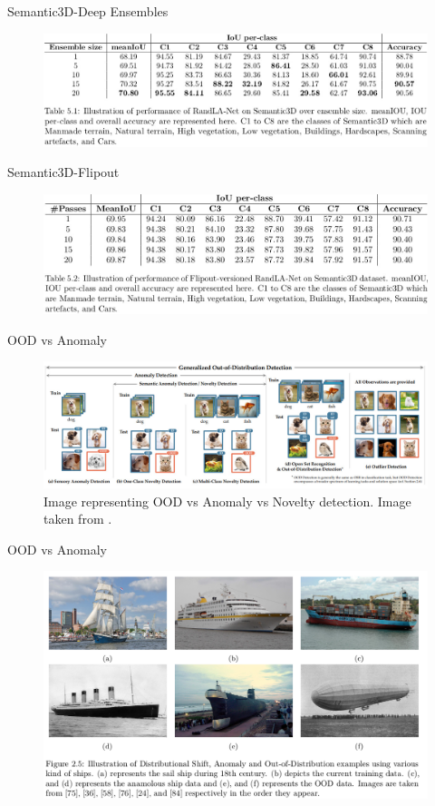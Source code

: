 \documentclass[aspectratio=169]{beamer}
\begin{document}
\begin{frame}[noframenumbering]{Semantic3D-Deep Ensembles}
    \begin{figure}
        \centering
        \includegraphics[scale=0.4]{images/Semantic3d_DE.jpg}
    \end{figure}
\end{frame}
\begin{frame}[noframenumbering]{Semantic3D-Flipout}
    \begin{figure}
        \centering
        \includegraphics[scale=0.4]{images/Semantic3d_Fout.jpg}
    \end{figure}
\end{frame}
\begin{frame}[noframenumbering]{OOD vs Anomaly}
    \begin{figure}
        \centering
        \includegraphics[scale=0.3]{images/OOD_ex_new.jpg}
        \caption{Image representing OOD vs Anomaly vs Novelty detection. Image taken from \cite{yang2021generalized}.}
        \label{fig:my_label}
    \end{figure}
\end{frame}
\begin{frame}{OOD vs Anomaly}
    \begin{figure}
        \centering
        \includegraphics[scale=0.3]{images/anomalyvsood.png}
    \end{figure}
\end{frame}
\end{document}
